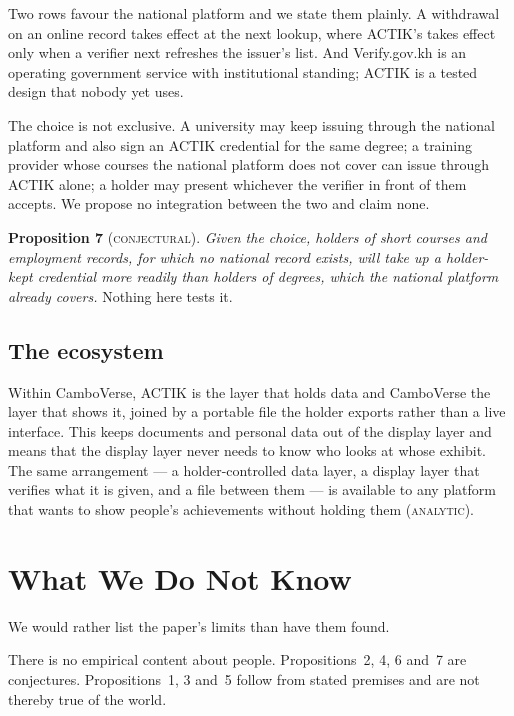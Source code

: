 \documentclass[10pt,a4paper,twocolumn]{article}
\newcommand{\kind}[1]{\textsc{#1}}
\begin{document}
Two rows favour the national platform and we state them plainly. A withdrawal on
an online record takes effect at the next lookup, where ACTIK's takes effect only
when a verifier next refreshes the issuer's list. And Verify.gov.kh is an
operating government service with institutional standing; ACTIK is a tested
design that nobody yet uses.

The choice is not exclusive. A university may keep issuing through the national
platform and also sign an ACTIK credential for the same degree; a training
provider whose courses the national platform does not cover can issue through
ACTIK alone; a holder may present whichever the verifier in front of them
accepts. We propose no integration between the two and claim none.

\textbf{Proposition 7} (\kind{conjectural}). \emph{Given the choice, holders of
short courses and employment records, for which no national record exists, will
take up a holder-kept credential more readily than holders of degrees, which the
national platform already covers.} Nothing here tests it.

\subsection{The ecosystem}

Within CamboVerse, ACTIK is the layer that holds data and CamboVerse the layer
that shows it, joined by a portable file the holder exports rather than a live
interface. This keeps documents and personal data out of the display layer and
means that the display layer never needs to know who looks at whose exhibit. The
same arrangement --- a holder-controlled data layer, a display layer that verifies
what it is given, and a file between them --- is available to any platform that
wants to show people's achievements without holding them (\kind{analytic}).

\section{What We Do Not Know}
\label{sec:unknown}

We would rather list the paper's limits than have them found.

There is no empirical content about people. Propositions~2, 4, 6 and~7 are
conjectures. Propositions~1, 3 and~5 follow from stated premises and are not
thereby true of the world.
\end{document}
